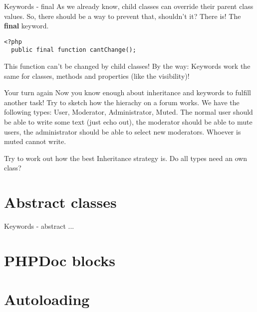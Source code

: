\begin{frame}[fragile]{Keywords - final}
	As we already know, child classes can override their parent class values. So, there should be a way to prevent that, shouldn't it? \pause
	There is! The \textbf{final} keyword.
	\begin{lstlisting}
<?php
  public final function cantChange();
    \end{lstlisting}
    \pause
    This function can't be changed by child classes!
    By the way: Keywords work the same for classes, methods and properties (like the visibility)!
\end{frame}


\begin{frame}[fragile]{Your turn again}
	Now you know enough about inheritance and keywords to fulfill another task! \pause Try to sketch how the hierachy on a forum works. We have the following types: User, Moderator, Administrator, Muted. The normal user should be able to write some text (just echo out), the moderator should be able to mute users, the administrator should be able to select new moderators. Whoever is muted cannot write.\pause
	
	Try to work out how the best Inheritance strategy is. \pause Do all types need an own class?
\end{frame}

\section{Abstract classes}

\begin{frame}[fragile]{Keywords - abstract}
	...
\end{frame}

\section{PHPDoc blocks}

\section{Autoloading}



